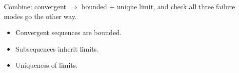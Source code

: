 \begin{remark*}
Combine: convergent $\Rightarrow$ bounded $+$ unique limit, and check all three failure modes go the other way.
\end{remark*}

\begin{remark*}[Dependencies]
\begin{itemize}
  \item Convergent sequences are bounded.
  \item Subsequences inherit limits.
  \item Uniqueness of limits.
\end{itemize}
\end{remark*}
